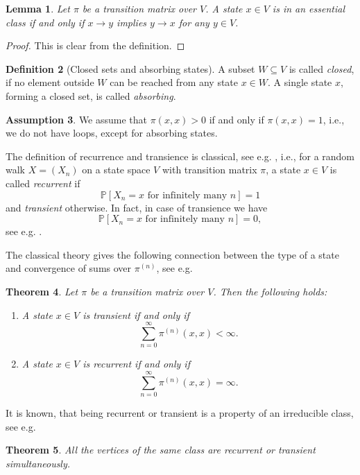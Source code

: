 \documentclass[a4paper,oneside, 12pt]{amsart}
\newtheorem{theorem}{Theorem}
\numberwithin{theorem}{section}
\newtheorem{lemma}[theorem]{Lemma}
\theoremstyle{definition}
\newtheorem{definition}[theorem]{Definition}
\newtheorem{assumption}[theorem]{Assumption}
\newcommand{\prob}{\pi}
\begin{document}
{\begin{lemma}
Let  $\prob$ be a transition matrix over $V$. A state $x\in V$  is in an essential class if and only if  $x\to y$ implies $y\to x$ for any $y\in V$.
\end{lemma}
\begin{proof}
	This is clear from the definition.
\end{proof}

\begin{definition}[Closed sets and absorbing states]
A subset $W\subseteq V$ is called {\em closed}, if no element outside $W$ can be reached from any state $x\in W$. A single state $x$, forming a closed set, is called {\em absorbing}.
\end{definition}

\begin{assumption}
We  assume that $\prob(x,x)>0$ if and only if $\prob(x,x)=1$, i.e., we do not have loops, except for absorbing states.
\end{assumption}

The definition of recurrence and transience is classical, see e.g. \cite[Chapter 3]{Woess09}, i.e., 
for a random walk $X=(X_n) $ on a state space $V$ with transition matrix $\prob$, a state $x\in V$ is called \emph{recurrent} if
$$
\mathbb P[X_n=x\mbox{ for infinitely many }n]=1
$$
and \emph{transient} otherwise. In fact, in case of transience we have 
$$
\mathbb P[X_n=x\mbox{ for infinitely many }n]=0,
$$
see e.g. \cite[3.2. Theorem]{Woess09}.

The classical theory gives the following connection between the type of a state and convergence of sums over $ \pi^{(n)} $, see e.g. \cite[3.4. Theorem (a)]{Woess09}
\begin{theorem}\label{thm:defrectr} Let $\prob$ be a transition matrix over $ V $. Then  the following holds:
\begin{enumerate}[label=$(\arabic*)$]
\item[(a)]
A state $x\in V$ is transient if and only if 
$$\displaystyle\sum_{n=0}^{\infty} \prob^{(n)}(x,x)<\infty.
$$
\item[(b)]
A state $x\in V$ is recurrent if and only if 
$$
\displaystyle\sum_{n=0}^{\infty} \prob^{(n)}(x,x)=\infty.
$$
\end{enumerate}
\end{theorem}

It is known, that  being recurrent or transient is a property of an irreducible class, see e.g. \cite[Theorem 3.4 and p. 45]{Woess09}
\begin{theorem}
All the vertices of the same class are recurrent or transient simultaneously.
\end{theorem}

}
\end{document}
